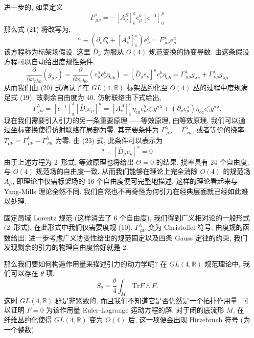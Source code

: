 \documentclass{article}
\begin{document}
进一步的, 如果定义
\begin{equation}
\Gamma_{\ \mu\nu}^{\rho}=-[A^{S}_{\nu}]^{a}_{b}e_{\mu}^{b}[e^{-1}]^{\rho}_{a}
\end{equation}
那么式 (21) 将改写为,
\begin{equation}
[\bar{D}_{\nu}e_{\mu}]^{a}\equiv (\partial_{\nu}\delta_{b}^{a}+[A_{\nu}^{A}]^{a}_{b})e_{\nu}^{b}=\Gamma^{\rho}_{\ \mu\nu}e_{\rho}^{a}
\end{equation}
该方程称为标架场假设. 这里 $\bar{D}_{\nu}$ 为服从 $O(4)$ 规范变换的协变导数. 由这条假设方程可以自动给出度规性条件,
\begin{equation}
\frac{\partial }{\partial x_{rho}}(g_{\mu\nu})=\frac{\partial }{\partial x_{rho}}(e_{\mu}^{a}e_{\nu}^{b}\eta_{ab})=[\bar{D}_{\rho}e_{\nu}]^{a}e_{\nu}^{b}\eta_{ab}=\Gamma^{\lambda}_{\ \mu\rho}g_{\lambda\nu}+\Gamma^{\lambda}_{\ \nu\rho}g_{\lambda\mu}
\end{equation}
从而我们由 (20) 式确认了在 $GL(4,\mathbb{R})$ 标架丛约化至 $O(4)$ 丛的过程中度规满足式 (19). 故剩余自由度为 40. 仿射联络由下式给出,
\begin{equation}
\Gamma_{\ \mu\nu}^{\lambda}=[e^{-1}]^{\lambda}_{a}[\bar{D}_{\nu}e_{\mu}]^{a}=[A_{\nu}^{A}]_{b}^{a}\eta_{ca}e_{\mu}^{b}e_{\sigma}^{c}g^{\sigma\lambda}+(\partial_{\nu}e_{\mu}^{a})\eta_{ca}e_{\sigma}^{c}g^{\sigma\lambda}.
\end{equation}
现在我们需要引入引力的另一条重要原理——等效原理, 由等效原理, 我们可以通过坐标变换使得仿射联络在局部为零. 其充要条件为 $\Gamma_{\ \mu\nu}^{\lambda}=\Gamma_{\ \nu\mu}^{\lambda}$, 或者等价的挠率 $T_{\mu\nu}=\Gamma_{\ \mu\nu}^{\lambda}-\Gamma_{\ \nu\mu}^{\lambda}$ 为零. 由 (23) 式, 此条件可以表示为
\begin{equation}
[\bar{D}_{\nu}e_{\mu}]^{a}-[\bar{D}_{\mu}e_{\nu}]^{a}=0
\end{equation}
由于上述方程为 2--形式, 等效原理也将给出 $\Theta=0$ 的结果. 挠率具有 24 个自由度, 与 $O(4)$ 规范场的自由度一致. 从而我们能够在理论上完全消除 $O(4)$ 的规范场 $A_{\mu}$, 即理论中仅需标架场的 16 个自由度便可完整地描述. 这样的理论看起来与 Yang-Mills 理论全然不同. 我们自然也不再奇怪为何引力在经典层面就已经如此难以处理.

固定局域 Lorentz 规范 (这样消去了 6 个自由度), 我们得到广义相对论的一般形式 (2--形式), 在此形式中我们仅需要度规 (10). $\Gamma_{\ \mu\nu}^{\lambda}$ 变为 Christoffel 符号, 由度规的函数给出. 进一步考虑广义协变性给出的规范固定以及四条 Gauss 定律的约束, 我们发现剩余的引力的物理自由度恰好就是 2.

那么我们要如何构造作用量来描述引力的动力学呢? 在 $GL(4,\mathbb{R})$ 规范理论中, 我们可以存在 $\theta$ 项,
\begin{equation}
S_{\theta}=\frac{\theta}{4}\int_{M}\,\text{Tr} F\wedge F.
\end{equation}
这时 $GL(4, \mathbb{R})$ 群是非紧致的, 而且我们不知道它是否仍然是一个拓扑作用量. 可以证明 $F=0$ 为该作用量 Euler-Lagrange 运动方程的解. 对于闭的底流形 $M$, 在纤维丛约化使得  $GL(4, \mathbb{R})$ 变为  $O(4)$ 后, 这一项便会出现 Hirzebruch 符号 (为一个整数).
\end{document}
